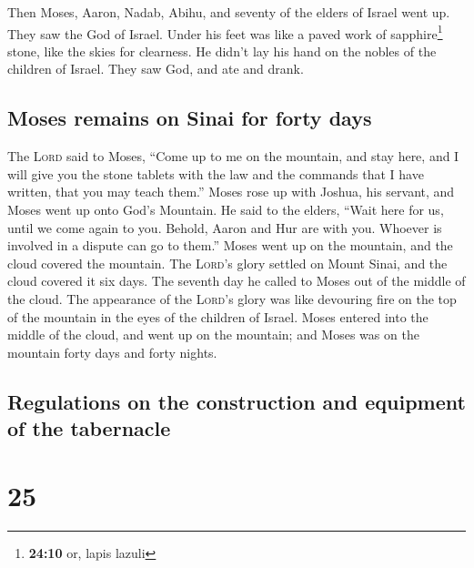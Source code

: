  Then Moses, Aaron, Nadab, Abihu, and seventy of the
elders of Israel went up.  They saw the God of Israel.
Under his feet was like a paved work of sapphire\footnote{\textbf{24:10}
  or, lapis lazuli} stone, like the skies for clearness. 
He didn't lay his hand on the nobles of the children of Israel. They saw
God, and ate and drank.

\hypertarget{moses-remains-on-sinai-for-forty-days}{%
\subsection{Moses remains on Sinai for forty
days}\label{moses-remains-on-sinai-for-forty-days}}

 The \textsc{Lord} said to Moses, ``Come up to me on the
mountain, and stay here, and I will give you the stone tablets with the
law and the commands that I have written, that you may teach them.''
 Moses rose up with Joshua, his servant, and Moses went
up onto God's Mountain.  He said to the elders, ``Wait
here for us, until we come again to you. Behold, Aaron and Hur are with
you. Whoever is involved in a dispute can go to them.'' 
Moses went up on the mountain, and the cloud covered the mountain.
 The \textsc{Lord}'s glory settled on Mount Sinai, and
the cloud covered it six days. The seventh day he called to Moses out of
the middle of the cloud.  The appearance of the
\textsc{Lord}'s glory was like devouring fire on the top of the mountain
in the eyes of the children of Israel.  Moses entered
into the middle of the cloud, and went up on the mountain; and Moses was
on the mountain forty days and forty nights.

\hypertarget{regulations-on-the-construction-and-equipment-of-the-tabernacle}{%
\subsection{Regulations on the construction and equipment of the
tabernacle}\label{regulations-on-the-construction-and-equipment-of-the-tabernacle}}

\hypertarget{section-24}{%
\section{25}\label{section-24}}

